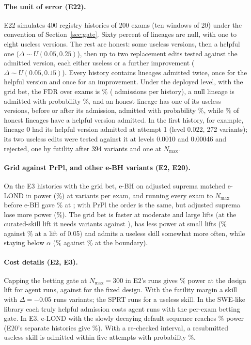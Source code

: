 \paragraph{The unit of error (E22).} E22 simulates 400 registry histories of 200 exams (ten windows of 20) under the convention of Section~\ref{sec:gate}. Sixty percent of lineages are null, with one to eight useless versions. The rest are honest: some useless versions, then a helpful one ($\Delta\sim U(0.05,0.25)$), then up to two replacement edits tested against the admitted version, each either useless or a further improvement ($\Delta\sim U(0.05,0.15)$). Every history contains lineages admitted twice, once for the helpful version and once for an improvement. Under the deployed level, with the grid bet, the FDR over exams is \NFuFdr\% (\NFuAdm{} admissions per history), a null lineage is admitted with probability \NFuNullLin\%, and an honest lineage has one of its useless versions, before or after its admission, admitted with probability \NFuHonFalse\%, while \NFuHonAdm\% of honest lineages have a helpful version admitted. In the first history, for example, lineage 0 had its helpful version admitted at attempt 1 (level 0.022, 272 variants); its two useless edits were tested against it at levels 0.0010 and 0.00046 and rejected, one by futility after 394 variants and one at $N_{\max}$.

\paragraph{Grid against PrPl, and other e-BH variants (E2, E20).} On the E3 histories with the grid bet, e-BH on adjusted suprema matched e-LOND in power (\NEbhGridSupPow\%) at \NEbhGridSupN{} variants per exam, and running every exam to $N_{\max}$ before e-BH gave \NEbhGridNmaxPow\% at \NEbhGridNmaxN{}; with PrPl the order is the same, but adjusted suprema lose more power (\NEbhPrplSupPow\%). The grid bet is faster at moderate and large lifts (at the curated-skill lift it needs \NGbCurGrid{} variants against \NGbCurPrpl), has less power at small lifts (\NETwoPowBetHalf\% against \NETwoPowBetHalfPrpl\% at a lift of 0.05) and admits a useless skill somewhat more often, while staying below $\alpha$ (\NETwoNullBet\% against \NETwoNullBetPrpl\% at the boundary).

\paragraph{Cost details (E2, E3).} Capping the betting gate at $N_{\max}=300$ in E2's runs gives \NETwoPowBetThree\% power at the design lift for \NETwoRunsBetThree{} agent runs, against \NETwoRunsFixed{} for the fixed design. With the futility margin a skill with $\Delta=-0.05$ runs \NETwoNBetFutNeg{} variants; the SPRT runs \NETwoNSPRTZero{} for a useless skill. In the SWE-like library each truly helpful admission costs \NEFiveSweRunsBet{} agent runs with the per-exam betting gate. In E3, e-LOND with the slowly decaying default sequence reaches \NEThreePowELond\% power (E20's separate histories give \NEbhGridElondPow\%). With a re-checked interval, a resubmitted useless skill is admitted within five attempts with probability \NResubFivePeekCI\%.

